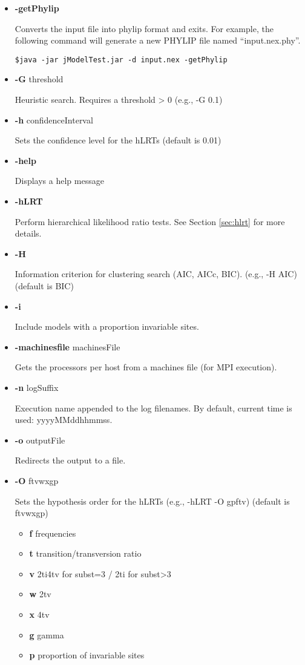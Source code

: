 \begin{itemize}
\item  {\bf -getPhylip}

Converts the input file into phylip format and exits. For example, the following command will generate a new PHYLIP file named ``input.nex.phy''.
\begin{lstlisting}
$java -jar jModelTest.jar -d input.nex -getPhylip
\end{lstlisting}

\item  {\bf -G} threshold

Heuristic search. Requires a threshold > 0 (e.g., -G 0.1)

\item  {\bf -h} confidenceInterval

Sets the confidence level for the hLRTs (default is 0.01)

\item  {\bf -help}

Displays a help message

\item  {\bf -hLRT}

Perform hierarchical likelihood ratio tests. See Section \ref{sec:hlrt} for more details.

\item  {\bf -H}

Information criterion for clustering search (AIC, AICc, BIC). (e.g., -H AIC) (default is BIC)

\item  {\bf -i}

Include models with a proportion invariable sites.

\item  {\bf -machinesfile} machinesFile

Gets the processors per host from a machines file (for MPI execution).

\item  {\bf -n} logSuffix

Execution name appended to the log filenames. By default, current time is used: yyyyMMddhhmmss.

\item  {\bf -o} outputFile

Redirects the output to a file.

\item  {\bf -O} {ftvwxgp}

Sets the hypothesis order for the hLRTs (e.g., -hLRT -O gpftv) (default is ftvwxgp)
\begin{itemize}
\item {\bf f} frequencies
\item {\bf t} transition/transversion ratio
\item {\bf v} 2ti4tv for subst=3 / 2ti for subst>3
\item {\bf w} 2tv
\item {\bf x} 4tv
\item {\bf g} gamma
\item {\bf p} proportion of invariable sites
\end{itemize}


\end{itemize}
